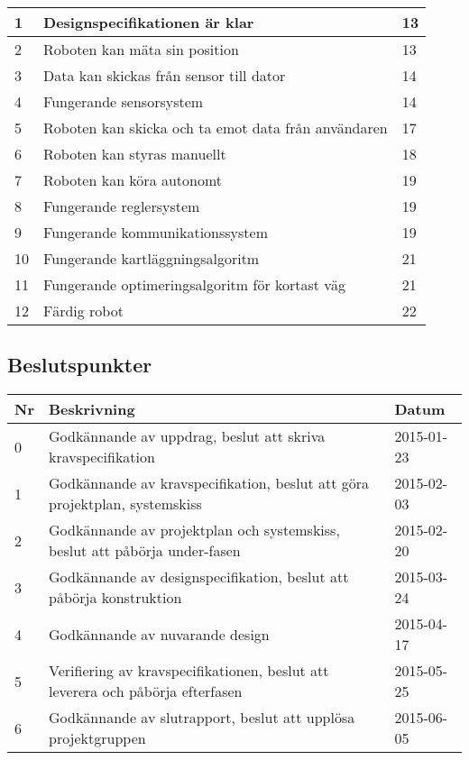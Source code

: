 \documentclass[11pt]{article}
\begin{document}
\begin{flushleft}
\begin{table}[h]
\begin{tabular}{|l|p{.75\linewidth}|l|}
1 &
Designspecifikationen är klar &
13\\ \hline

2 &
Roboten kan mäta sin position &
13 \\ \hline

3 &
Data kan skickas från sensor till dator&
14\\ \hline

4 &
Fungerande sensorsystem &
14 \\ \hline


5 &
Roboten kan skicka och ta emot data från användaren&
17\\ \hline

6 &
Roboten kan styras manuellt &
18\\ \hline

7 &
Roboten kan köra autonomt &
19\\ \hline

8 &
Fungerande reglersystem  &
19 \\ \hline

9 &
Fungerande kommunikationssystem &
19\\ \hline

10 &
Fungerande kartläggningsalgoritm &
21\\ \hline

11 &
Fungerande optimeringsalgoritm för kortast väg &
21\\ \hline

12 &
Färdig robot &
22\\ \hline
 
\end{tabular}
\end{table}

\subsection{Beslutspunkter}
\begin{table}[h]
\begin{tabular}{|l|p{.75\linewidth}|l|} \hline

Nr &
Beskrivning &
Datum \\ \hline

0 &
Godkännande av uppdrag, beslut att skriva kravspecifikation &
2015-01-23 \\ \hline
1 &
Godkännande av kravspecifikation, beslut att göra projektplan, systemskiss &
2015-02-03 \\ \hline
2 &
Godkännande av projektplan och systemskiss, beslut att påbörja under-fasen &
2015-02-20 \\ \hline
3 &
Godkännande av designspecifikation, beslut att påbörja konstruktion &
2015-03-24 \\ \hline
4 &
Godkännande av nuvarande design &
2015-04-17 \\ \hline
5 &
Verifiering av kravspecifikationen, beslut att leverera och påbörja efterfasen &
2015-05-25 \\ \hline
6 &
Godkännande av slutrapport, beslut att upplösa projektgruppen &
2015-06-05 \\ \hline
 

\end{tabular}
\end{table}
\end{flushleft}
\end{document}
